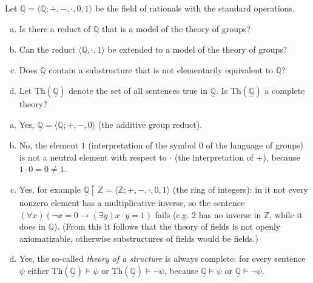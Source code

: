 \begin{problem}

    Let $\underline{\mathbb{Q}}=\langle\mathbb{Q};+,-,\cdot,0,1 \rangle$ be the field of rationals with the standard operations.
    \begin{enumerate}[(a)]                
        \item Is there a reduct of $\underline{\mathbb{Q}}$ that is a model of the theory of groups?
        \item Can the reduct $\langle\mathbb{Q},\cdot,1\rangle$ be extended to a model of the theory of groups?
        \item Does $\underline{\mathbb{Q}}$ contain a substructure that is not elementarily equivalent to $\underline{\mathbb{Q}}$?
        \item Let $\mathrm{Th}(\underline{\mathbb{Q}})$ denote the set of all sentences true in $\underline{\mathbb{Q}}$. Is $\mathrm{Th}(\underline{\mathbb{Q}})$ a complete theory?
    \end{enumerate}

    \begin{solution}

        \begin{enumerate}[(a)]
            \item Yes, $\underline{\mathbb{Q}}=\langle\mathbb{Q};+,-,0\rangle$ (the additive group reduct).
            \item No, the element $1$ (interpretation of the symbol $0$ of the language of groups) is not a neutral element with respect to $\cdot$ (the interpretation of $+$), because $1\cdot 0=0\neq 1$.
            \item Yes, for example $\underline{\mathbb{Q}}\restriction\mathbb Z =\langle\mathbb{Z};+,-,\cdot,0,1 \rangle$ (the ring of integers): in it not every nonzero element has a multiplicative inverse, so the sentence $(\forall x)(\neg x=0\to (\exists y)x\cdot y=1)$ fails (e.g. $2$ has no inverse in $\mathbb Z$, while it does in $\mathbb Q$). (From this it follows that the theory of fields is not openly axiomatizable, otherwise substructures of fields would be fields.)
            \item Yes, the so-called \emph{theory of a structure} is always complete: for every sentence $\psi$ either $\mathrm{Th}(\underline{\mathbb{Q}})\models\psi$ or $\mathrm{Th}(\underline{\mathbb{Q}})\models\neg\psi$, because $\underline{\mathbb{Q}}\models\psi$ or $\underline{\mathbb{Q}}\models\neg\psi$.
        \end{enumerate}
                    
    \end{solution}

\end{problem}



